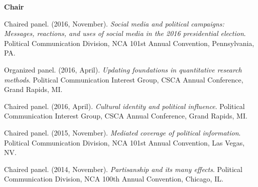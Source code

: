 {\large\textbf{Chair}} \vspace{.5em}

  \begin{bibenum}
    \item[] Chaired panel. (2016, November).
      \textit{Social media and political campaigns: Messages, reactions, and uses of social media in the 2016 presidential election}.
      Political Communication Division, NCA 101st Annual Convention, Pennsylvania, PA.

    \item[] Organized panel. (2016, April).
      \textit{Updating foundations in quantitative research methods}.
      Political Communication Interest Group, CSCA Annual Conference, Grand Rapids, MI.

    \item[] Chaired panel. (2016, April).
      \textit{Cultural identity and political influence}.
      Political Communication Interest Group, CSCA Annual Conference, Grand Rapids, MI.

    \item[] Chaired panel. (2015, November).
      \textit{Mediated coverage of political information}.
      Political Communication Division, NCA 101st Annual Convention, Las Vegas, NV.

    \item[] Chaired panel. (2014, November).
      \textit{Partisanship and its many effects}.
      Political Communication Division, NCA 100th Annual Convention, Chicago, IL.
  \end{bibenum}

\vspace{1em}
